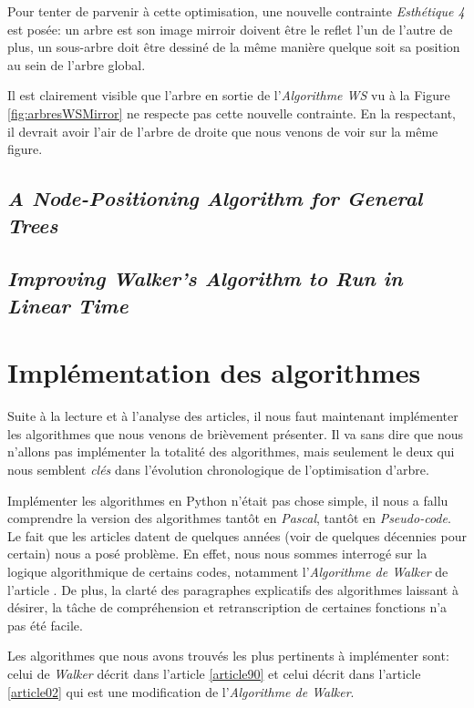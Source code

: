 \documentclass{article}
\begin{document}
  Pour tenter de parvenir à cette optimisation, une nouvelle contrainte \emph{Esthétique 4} est posée: un arbre est son image mirroir doivent être le reflet l'un de l'autre de plus, un sous-arbre doit être dessiné de la même manière quelque soit sa position au sein de l'arbre global.

  Il est clairement visible que l'arbre en sortie de l'\emph{Algorithme WS} vu à la Figure \ref{fig:arbresWSMirror} ne respecte pas cette nouvelle contrainte. En la respectant, il devrait avoir l'air de l'arbre de droite que nous venons de voir sur la même figure.




  \subsection{\emph{A Node-Positioning Algorithm for General Trees}}
  \subsection{\emph{Improving Walker’s Algorithm to Run in Linear Time}}


\newpage
\section{Implémentation des algorithmes}

Suite à la lecture et à l'analyse des articles, il nous faut maintenant implémenter les algorithmes que nous venons de brièvement présenter. Il va sans dire que nous n'allons pas implémenter la totalité des algorithmes, mais seulement le deux qui nous semblent \emph{clés} dans l'évolution chronologique de l'optimisation d'arbre.

Implémenter les algorithmes en Python n'était pas chose simple, il nous a fallu comprendre la version des algorithmes tantôt en \emph{Pascal}, tantôt en \emph{Pseudo-code}. Le fait que les articles datent de quelques années (voir de quelques décennies pour certain) nous a posé problème. En effet, nous nous sommes interrogé sur la logique algorithmique de certains codes, notamment l'\emph{Algorithme de Walker} de l'article \cite{article90}. De plus, la clarté des paragraphes explicatifs des algorithmes laissant à désirer, la tâche de compréhension et retranscription de certaines fonctions n'a pas été facile.

Les algorithmes que nous avons trouvés les plus pertinents à implémenter sont: celui de \emph{Walker} décrit dans l'article \ref{article90} et celui décrit dans l'article \ref{article02} qui est une modification de l'\emph{Algorithme de Walker}.
\end{document}
